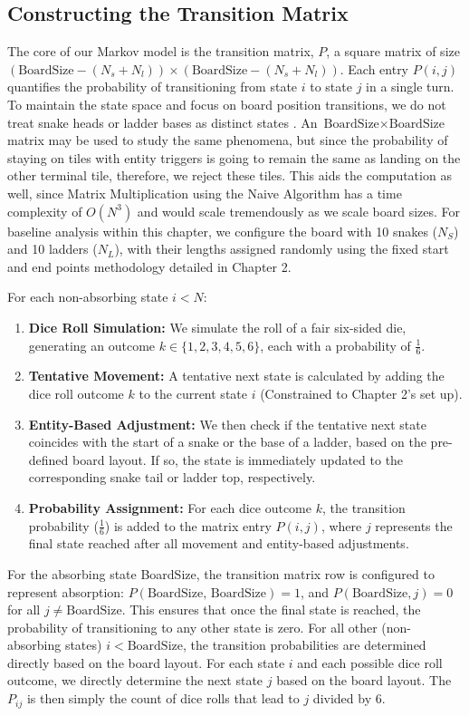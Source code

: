\subsection{Constructing the Transition Matrix}
The core of our Markov model is the transition matrix, $P$, a square matrix of size $(\text{BoardSize}-(N_s + N_l)) \times (\text{BoardSize}-(N_s + N_l))$. Each entry $P(i,j)$ quantifies the probability of transitioning from state $i$ to state $j$ in a single turn. To maintain the state space and focus on board position transitions, we do not treat snake heads or ladder bases as distinct states \autocite{dusautoyWorldEightyGames2024}. An $\text{BoardSize}\times \text{BoardSize}$ matrix may be used to study the same phenomena, but since the probability of staying on tiles with entity triggers is going to remain the same as landing on the other terminal tile, therefore, we reject these tiles. This aids the computation as well, since Matrix Multiplication using the Naive Algorithm has a time complexity of $O(N^3)$ and would scale tremendously as we scale board sizes. For baseline analysis within this chapter, we configure the board with 10 snakes ($N_S$) and 10 ladders ($N_L$), with their lengths assigned randomly using the fixed start and end points methodology detailed in Chapter 2.

For each non-absorbing state $i < N$:
\begin{enumerate}
	\item \textbf{Dice Roll Simulation:} We simulate the roll of a fair six-sided die, generating an outcome $k \in \{1, 2, 3, 4, 5, 6\}$, each with a probability of $\frac{1}{6}$.
	\item \textbf{Tentative Movement:} A tentative next state is calculated by adding the dice roll outcome $k$ to the current state $i$ (Constrained to Chapter 2's set up).
	\item \textbf{Entity-Based Adjustment:} We then check if the tentative next state coincides with the start of a snake or the base of a ladder, based on the pre-defined board layout. If so, the state is immediately updated to the corresponding snake tail or ladder top, respectively.
	\item \textbf{Probability Assignment:} For each dice outcome $k$, the transition probability ($\frac{1}{6}$) is added to the matrix entry $P(i, j)$, where $j$ represents the final state reached after all movement and entity-based adjustments.
\end{enumerate}

For the absorbing state BoardSize, the transition matrix row is configured to represent absorption: $P(\text{BoardSize, BoardSize}) = 1$, and $P(\text{BoardSize}, j) = 0$ for all $j \neq \text{BoardSize}$. This ensures that once the final state is reached, the probability of transitioning to any other state is zero. For all other (non-absorbing states) $i<\text{BoardSize}$, the transition probabilities are determined directly based on the board layout. For each state $i$ and each possible dice roll outcome, we directly determine the next state $j$ based on the board layout. The $P_{ij}$ is then simply the count of dice rolls that lead to $j$ divided by 6.

